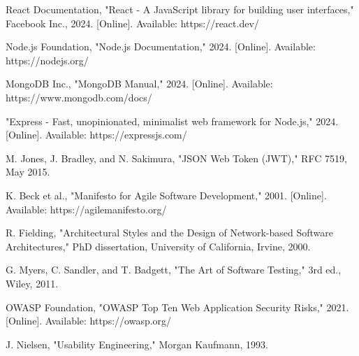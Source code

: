 \begin{thebibliography}{99}

React Documentation, "React - A JavaScript library for building user interfaces," Facebook Inc., 2024. [Online]. Available: https://react.dev/

Node.js Foundation, "Node.js Documentation," 2024. [Online]. Available: https://nodejs.org/

MongoDB Inc., "MongoDB Manual," 2024. [Online]. Available: https://www.mongodb.com/docs/

"Express - Fast, unopinionated, minimalist web framework for Node.js," 2024. [Online]. Available: https://expressjs.com/

M. Jones, J. Bradley, and N. Sakimura, "JSON Web Token (JWT)," RFC 7519, May 2015.

K. Beck et al., "Manifesto for Agile Software Development," 2001. [Online]. Available: https://agilemanifesto.org/

R. Fielding, "Architectural Styles and the Design of Network-based Software Architectures," PhD dissertation, University of California, Irvine, 2000.

G. Myers, C. Sandler, and T. Badgett, "The Art of Software Testing," 3rd ed., Wiley, 2011.

OWASP Foundation, "OWASP Top Ten Web Application Security Risks," 2021. [Online]. Available: https://owasp.org/

J. Nielsen, "Usability Engineering," Morgan Kaufmann, 1993.

\end{thebibliography}
